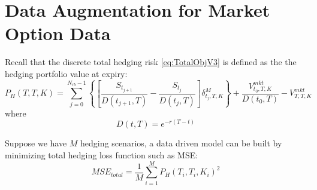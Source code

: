 \documentclass[letterpaper,12pt,titlepage,oneside,final]{book}
\numberwithin{equation}{section}
\theoremstyle{definition}
\newcommand{\Vmkt}{V^{mkt}}
\newcommand{\Smkt}{S}
\begin{document}
\section{Data Augmentation for Market Option Data}
\label{sec:DataAugmentation}
Recall that the discrete total hedging risk \eqref{eq:TotalObjV3} is defined as the the hedging portfolio value at expiry:
\[
P_H(T,T,K)=\sum_{j=0}^{N_{rb}-1}\left\{ \left[\frac{\Smkt_{t_{j+1}}}{D(t_{j+1},T)}-\frac{\Smkt_{t_{j}}}{D(t_{j},T)}\right] \delta^M_{t_j,T,K} \right\}+\frac{\Vmkt_{t_0,T,K}}{D(t_{0},T)}-\Vmkt_{T,T,K}
\]
where
\[D(t,T)=e^{-r(T-t)}\]

Suppose we have $M$ hedging scenarios, a data driven model can be built by minimizing total hedging loss function such as MSE:
\[
    MSE_{total}=\frac{1}{M}\sum_{i=1}^M P_H(T_i,T_i,K_i)^2
\]
\end{document}
